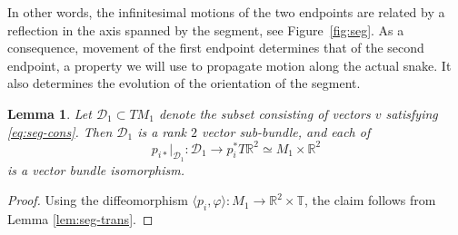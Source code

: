 \documentclass{article}
\def\sD{\mathscr{D}}
\def\RR{\mathbb{R}}
\def\TT{\mathbb{T}}
\newtheorem{lem}{Lemma}
\theoremstyle{definition}
\begin{document}
In other words, the infinitesimal motions of the two endpoints
are related by a reflection in the axis spanned by the segment,
see Figure~\ref{fig:seg}. As a consequence, movement of the first endpoint 
determines that of the second endpoint, a property we will use to
propagate motion along the actual snake. 
It also determines the evolution of the orientation of the segment.
\begin{lem}\label{lem:seg-iso}
Let $\sD_1 \subset TM_1$
denote the subset consisting of vectors $v$ satisfying
\eqref{eq:seg-cons}. Then $\sD_1$ is a rank $2$ vector
sub-bundle, and each of $$p_{i*}|_{\sD_1} : \sD_1 \to p_i^* T\RR^2 \simeq
M_1\times\RR^2$$ is a vector bundle isomorphism.
\end{lem}
\begin{proof}
        Using the diffeomorphism $\langle p_i,\varphi\rangle : M_1 \to \RR^2\times\TT$,
        the claim follows from Lemma \ref{lem:seg-trans}.
\end{proof}
\end{document}
